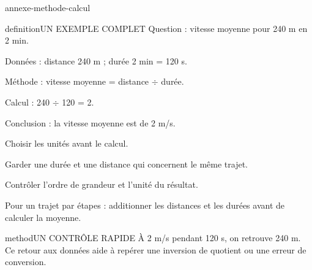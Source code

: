 \documentclass[12pt,twoside,openany]{book}
\begin{document}
\label{methode-calcul}
\begin{pcFiche}{annexe-methode-calcul}
\begin{pcEncadre}{definition}{UN EXEMPLE COMPLET}
Question : vitesse moyenne pour 240 m en 2 min.\par Données : distance 240 m ; durée 2 min = 120 s.\par Méthode : vitesse moyenne = distance \(\div\) durée.\par Calcul : 240 \(\div\) 120 = 2.\par Conclusion : la vitesse moyenne est de 2 m/s.\par
\end{pcEncadre}
\begin{questions}
\item Choisir les unités avant le calcul.
\item Garder une durée et une distance qui concernent le même trajet.
\item Contrôler l’ordre de grandeur et l’unité du résultat.
\item Pour un trajet par étapes : additionner les distances et les durées avant de calculer la moyenne.
\end{questions}
\begin{pcEncadre}{method}{UN CONTRÔLE RAPIDE}
À 2 m/s pendant 120 s, on retrouve 240 m. Ce retour aux données aide à repérer une inversion de quotient ou une erreur de conversion.\par
\end{pcEncadre}
\end{pcFiche}
\label{unites}
\end{document}
